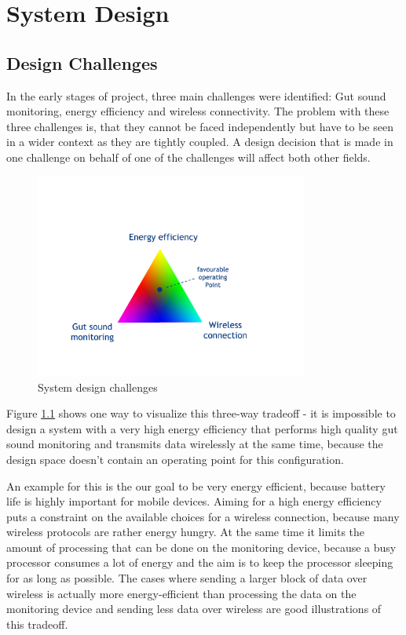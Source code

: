 \chapter{System Design}


\section{Design Challenges}
\label{sec:design_challenges}
In the early stages of project, three main challenges were identified: Gut sound monitoring, energy efficiency and wireless connectivity. The problem with these three challenges is, that they cannot be faced independently but have to be seen in a wider context as they are tightly coupled. A design decision that is made in one challenge on behalf of one of the challenges will affect both other fields. 

\begin{figure}
\centering
\includegraphics[width=0.8\textwidth]{Images/design_challenges}
\caption{System design challenges}
\label{fig:design_challenges}
\end{figure}

Figure \ref{fig:design_challenges} shows one  way to visualize this three-way tradeoff - it is impossible to design a system with a very high energy efficiency that performs high quality gut sound monitoring and transmits data wirelessly at the same time, because the design space doesn’t contain an operating point for this configuration. 

An example for this is the our goal to be very energy efficient, because battery life is highly important for mobile devices. Aiming for a high energy efficiency puts a constraint on the available choices for a wireless connection, because many wireless protocols are rather energy hungry. At the same time it limits the amount of processing that can be done on the monitoring device, because a busy processor consumes a lot of energy and the aim is to keep the processor sleeping for as long as possible. The cases where sending a larger block of data over wireless is actually more energy-efficient than processing the data on the monitoring device and sending less data over wireless are good illustrations of this tradeoff. 


